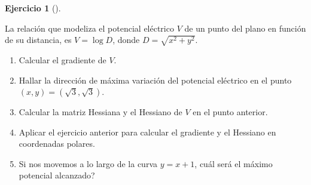 \documentclass[
  spanish,
  a4paper,
]{scrreport}
\theoremstyle{definition}
\newtheorem{exercise}{Ejercicio}[chapter]
\theoremstyle{remark}
\begin{document}
\begin{exercise}[]\protect\hypertarget{exr-potencial-electrico}{}\label{exr-potencial-electrico}

La relación que modeliza el potencial eléctrico \(V\) de un punto del
plano en función de su distancia, es \(V=\log D\), donde
\(D=\sqrt{x^2+y^2}\).

\begin{enumerate}
\def\labelenumi{\alph{enumi}.}
\item
  Calcular el gradiente de \(V\).
\item
  Hallar la dirección de máxima variación del potencial eléctrico en el
  punto \((x,y)=(\sqrt{3},\sqrt{3})\).
\item
  Calcular la matriz Hessiana y el Hessiano de \(V\) en el punto
  anterior.
\item
  Aplicar el ejercicio anterior para calcular el gradiente y el Hessiano
  en coordenadas polares.
\item
  Si nos movemos a lo largo de la curva \(y=x+1\), cuál será el máximo
  potencial alcanzado?
\end{enumerate}

\end{exercise}
\end{document}
